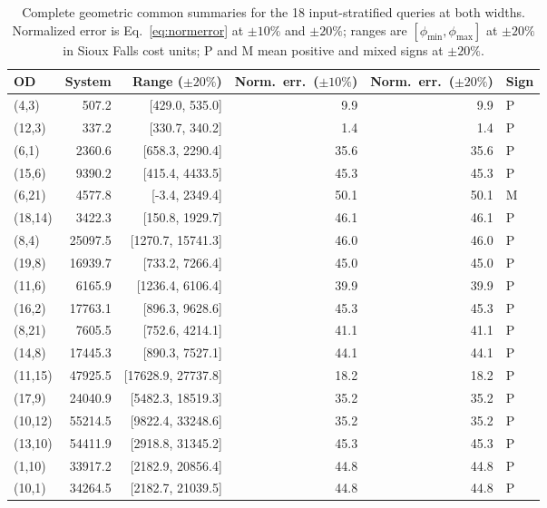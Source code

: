 \begin{table}[pos=htbp]\centering\footnotesize\caption{Complete geometric common summaries for the 18 input-stratified queries at both widths. Normalized error is Eq.~\eqref{eq:normerror} at $\pm10\%$ and $\pm20\%$; ranges are $[\phi_{\min},\phi_{\max}]$ at $\pm20\%$ in Sioux Falls cost units; P and M mean positive and mixed signs at $\pm20\%$.}\label{tab:coveragefull}\begin{tabular}{lrrrrl}\toprule OD & System & Range ($\pm20\%$) & Norm.\ err.\ ($\pm10\%$) & Norm.\ err.\ ($\pm20\%$) & Sign\\\midrule
(4,3) & 507.2 & [429.0, 535.0] & 9.9 & 9.9 & P\\
(12,3) & 337.2 & [330.7, 340.2] & 1.4 & 1.4 & P\\
(6,1) & 2360.6 & [658.3, 2290.4] & 35.6 & 35.6 & P\\
(15,6) & 9390.2 & [415.4, 4433.5] & 45.3 & 45.3 & P\\
(6,21) & 4577.8 & [-3.4, 2349.4] & 50.1 & 50.1 & M\\
(18,14) & 3422.3 & [150.8, 1929.7] & 46.1 & 46.1 & P\\
(8,4) & 25097.5 & [1270.7, 15741.3] & 46.0 & 46.0 & P\\
(19,8) & 16939.7 & [733.2, 7266.4] & 45.0 & 45.0 & P\\
(11,6) & 6165.9 & [1236.4, 6106.4] & 39.9 & 39.9 & P\\
(16,2) & 17763.1 & [896.3, 9628.6] & 45.3 & 45.3 & P\\
(8,21) & 7605.5 & [752.6, 4214.1] & 41.1 & 41.1 & P\\
(14,8) & 17445.3 & [890.3, 7527.1] & 44.1 & 44.1 & P\\
(11,15) & 47925.5 & [17628.9, 27737.8] & 18.2 & 18.2 & P\\
(17,9) & 24040.9 & [5482.3, 18519.3] & 35.2 & 35.2 & P\\
(10,12) & 55214.5 & [9822.4, 33248.6] & 35.2 & 35.2 & P\\
(13,10) & 54411.9 & [2918.8, 31345.2] & 45.3 & 45.3 & P\\
(1,10) & 33917.2 & [2182.9, 20856.4] & 44.8 & 44.8 & P\\
(10,1) & 34264.5 & [2182.7, 21039.5] & 44.8 & 44.8 & P\\
\bottomrule\end{tabular}\end{table}

